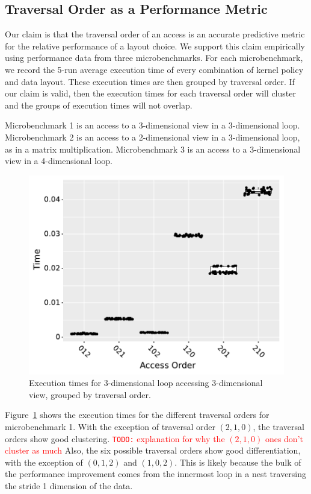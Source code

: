 \documentclass[sigconf, table]{acmart}
\newcommand{\todo}[1]{{\textcolor{red}{{\tt{TODO:}}\,\,#1 }}}
\begin{document}
\subsection{Traversal Order as a Performance Metric}

Our claim is that the traversal order of an access is an accurate predictive metric for the relative performance of a layout choice. 
We support this claim empirically using performance data from three microbenchmarks.
For each microbenchmark, we record the 5-run average execution time of every combination of kernel policy and data layout. 
These execution times are then grouped by traversal order.
If our claim is valid, then the execution times for each traversal order will cluster and the groups of execution times will not overlap.

Microbenchmark 1 is an access to a 3-dimensional view in a 3-dimensional loop. 
Microbenchmark 2 is an access to a 2-dimensional view in a 3-dimensional loop, as in a matrix multiplication.
Microbenchmark 3 is an access to a 3-dimensional view in a 4-dimensional loop.

\begin{figure}
  \includegraphics{benchmark1_boxplot.pdf}
  \caption{Execution times for 3-dimensional loop accessing 3-dimensional view, grouped by traversal order.}
  \label{TraversalBenchmark1}
\end{figure}
Figure~\ref{TraversalBenchmark1} shows the execution times for the different traversal orders for microbenchmark 1. 
With the exception of traversal order $(2,1,0)$, the traversal orders show good clustering.
\todo{explanation for why the $(2,1,0)$ ones don't cluster as much}
Also, the six possible traversal orders show good differentiation, with the exception of $(0,1,2)$ and $(1,0,2)$. 
This is likely because the bulk of the performance improvement comes from the innermost loop in a nest traversing the stride 1 dimension of the data.
\end{document}
